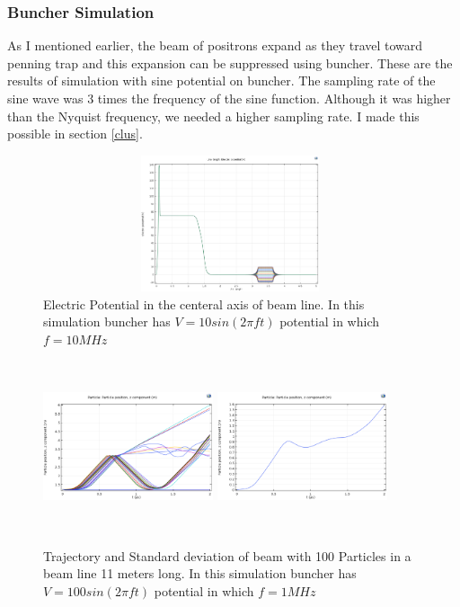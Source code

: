 \documentclass[12pt,a4paper]{article}
\begin{document}
\subsubsection{Buncher Simulation}
As I mentioned earlier, the beam of positrons expand as they travel toward penning trap and this expansion can be suppressed using buncher. These are the results of simulation with sine potential on buncher. The sampling rate of the sine wave was 3 times the frequency of the sine function.  Although it was higher than the Nyquist frequency, we needed a higher sampling rate. I made this possible in section \ref{clus}.

\begin{figure}[h]
\centering
\includegraphics[width=110mm, height=40mm]{potential_buncher}
\caption{Electric Potential in the centeral axis of beam line. In this simulation buncher has $ V = 10 sin(2 \pi f t) $ potential in which $ f=10 MHz $}
\end{figure}

\begin{figure}[h]
\centering
\includegraphics[width=50mm, height=50mm]{buncer-in-100V-1Mhz-50Particles}
\includegraphics[width=50mm, height=50mm]{buncer-std-100V-1Mhz-50Particles}
\caption{Trajectory and Standard deviation of beam with 100 Particles in a beam line 11 meters long. In this simulation buncher has $ V = 100 sin(2 \pi f t) $ potential in which $ f=1 MHz $}
\end{figure}
\end{document}
